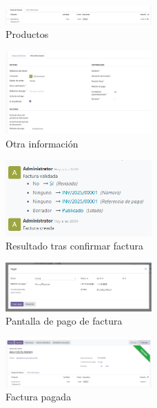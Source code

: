 \documentclass[a4paper,12pt]{article}
\begin{document}
\begin{figure}[h!]
    \centering
    \includegraphics[width=0.5\textwidth]{pr2odoo06-facturac04.png}
    \caption{Productos}
\end{figure}
\FloatBarrier

\begin{figure}[h!]
    \centering
    \includegraphics[width=0.5\textwidth]{pr2odoo07-facturac05.png}
    \caption{Otra información}
\end{figure}
\FloatBarrier

\begin{figure}[h!]
    \centering
    \includegraphics[width=0.5\textwidth]{pr2odoo08-facturac06.png}
    \caption{Resultado tras confirmar factura}
\end{figure}
\FloatBarrier

\begin{figure}[h!]
    \centering
    \includegraphics[width=0.5\textwidth]{pr2odoo09-facturac07.png}
    \caption{Pantalla de pago de factura}
\end{figure}
\FloatBarrier

\begin{figure}[h!]
    \centering
    \includegraphics[width=0.5\textwidth]{pr2odoo10-facturac08.png}
    \caption{Factura pagada}
\end{figure}
\FloatBarrier
\end{document}

